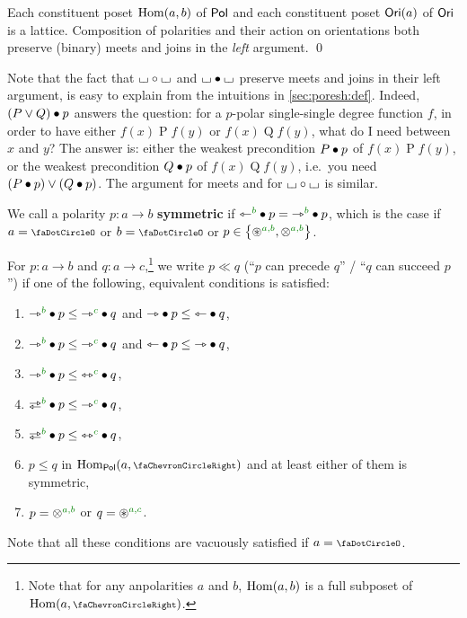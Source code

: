 \documentclass[a4paper]{memoir}
\begin{document}
\begin{proposition}
	\label{thm:pol-lattice}
	\label{thm:ori-lattice}
	\label{thm:pol-pol-lattice}
	\label{thm:ori-pol-lattice}
	Each constituent poset ${\mathrm{Hom}}(a, b)$ of ${\mathsf{Pol}}$ and each constituent poset ${\mathsf{Ori}}(a)$ of ${\mathsf{Ori}}$ is a lattice.
	Composition of polarities and their action on orientations both preserve (binary) meets and joins in the \emph{left} argument. \qed
\end{proposition}
Note that the fact that ${\llcorner\hspace{-.4ex}\lrcorner} \circ {\llcorner\hspace{-.4ex}\lrcorner}$ and ${\llcorner\hspace{-.4ex}\lrcorner} \mathbin{\bullet} {\llcorner\hspace{-.4ex}\lrcorner}$ preserve meets and joins in their left argument, is easy to explain from the intuitions in \cref{sec:poresh:def}.
Indeed, $(P \vee Q) \mathbin{\bullet} p$ answers the question: for a $p$-polar single-single degree function $f$, in order to have either $f(x) \mathrel{P} f(y)$ or $f(x) \mathrel{Q} f(y)$, what do I need between $x$ and $y$?
The answer is: either the weakest precondition $P \mathbin{\bullet} p$ of $f(x) \mathrel{P} f(y)$, or the weakest precondition $Q \mathbin{\bullet} p$ of $f(x) \mathrel{Q} f(y)$, i.e.\ you need $(P \mathbin{\bullet} p) \vee (Q \mathbin{\bullet} p)$.
The argument for meets and for ${\llcorner\hspace{-.4ex}\lrcorner} \circ {\llcorner\hspace{-.4ex}\lrcorner}$ is similar.
\begin{definition} \label{def:precede-polarity}
	We call a polarity $p : a \to b$ \textbf{symmetric} if $\tejsym \pmr b \oriof p = \jetsym \pmr b \oriof p$, which is the case if $a = \npolar$ or $b = \npolar$ or $p \in \accol{\isopol \pmrhom a b, \mixpol \pmrhom a b}$.
	
	For $p : a \to b$ and $q : a \to c$,\footnote{Note that for any anpolarities $a$ and $b$, ${\mathrm{Hom}}(a, b)$ is a full subposet of $\Hom(a, \ypolar)$.} we write $p \ll q$ (``$p$ can precede $q$'' / ``$q$ can succeed $p$'') if one of the following, equivalent conditions is satisfied:
	\begin{enumerate}
		\item $\jetsym\pmr{b} \oriof p \leq \jetsym\pmr{c} \oriof q$ and ${\rightarrowtriangle} \mathbin{\bullet} p \leq {\leftarrowtriangle} \mathbin{\bullet} q$,
		\item $\jetsym\pmr{b} \oriof p \leq \jetsym\pmr{c} \oriof q$ and ${\leftarrowtriangle} \mathbin{\bullet} p \leq {\rightarrowtriangle} \mathbin{\bullet} q$,
		\item $\jetsym\pmr{b} \oriof p \leq \equijetsym\pmr{c} \oriof q$,
		\item $\infrajetsym\pmr{b} \oriof p \leq \jetsym\pmr{c} \oriof q$,
		\item $\infrajetsym\pmr{b} \oriof p \leq \equijetsym\pmr{c} \oriof q$,
		\item $p \leq q$ in $\Hom_\polcat(a, \ypolar)$ and at least either of them is symmetric,
		\item $p = \mixpol\pmrhom{a}{b}$ or $q = \isopol\pmrhom{a}{c}$.
	\end{enumerate}
	Note that all these conditions are vacuously satisfied if $a = \npolar$.
\end{definition}
\end{document}
